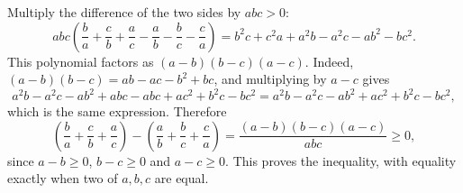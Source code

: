 Multiply the difference of the two sides by $abc>0$:
\[
abc\left(\dfrac {b}{a}+\dfrac {c}{b}+\dfrac {a}{c}-\dfrac {a}{b}-\dfrac {b}{c}-\dfrac {c}{a}\right)=b^2c+c^2a+a^2b-a^2c-ab^2-bc^2 .
\]
This polynomial factors as $(a-b)(b-c)(a-c)$. Indeed, $(a-b)(b-c)=ab-ac-b^2+bc$, and multiplying by $a-c$ gives
\[
a^2b-a^2c-ab^2+abc-abc+ac^2+b^2c-bc^2=a^2b-a^2c-ab^2+ac^2+b^2c-bc^2,
\]
which is the same expression. Therefore
\[
\left(\dfrac {b}{a}+\dfrac {c}{b}+\dfrac {a}{c}\right)-\left(\dfrac {a}{b}+\dfrac {b}{c}+\dfrac {c}{a}\right)=\dfrac{(a-b)(b-c)(a-c)}{abc}\ge0,
\]
since $a-b\ge0$, $b-c\ge0$ and $a-c\ge0$. This proves the inequality, with equality exactly when two of $a,b,c$ are equal.
